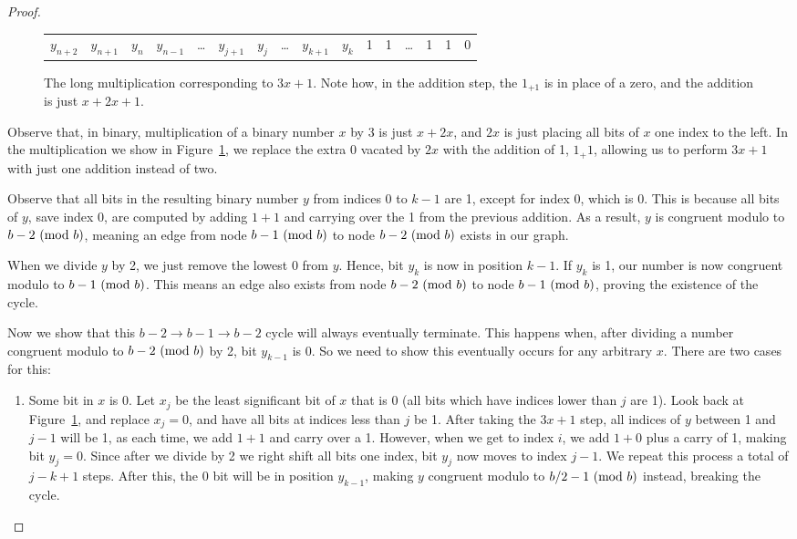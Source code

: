 \begin{proof}
\begin{figure}
\begin{tabular}{*{16}c}
  \hline
  $ y_{n+2}$  & $ y_{n+1}$  & $ y_{n}$  & $ y_{n-1}$  & \ldots & $ y_{j+1}$  & $ y_{j}$  & \ldots & $ y_{k+1}$  & $ y_{k}$  & 1 & 1 & \ldots & 1 & 1 & 0 
\end{tabular}
\caption{The long multiplication corresponding to $3x + 1$. Note how, in the addition step, the $1_{+1}$ is in place of a zero, and the addition is just $x + 2x + 1$.}
\label{fig:mul}
\end{figure}
Observe that, in binary, multiplication of a binary number $x$ by 3 is just $x + 2x$, and $2x$ is just placing all bits of $x$ one index to the left. In the multiplication we show in Figure~\ref{fig:mul}, we replace the extra 0 vacated by $2x$ with the addition of 1, $1_+1$, allowing us to perform $3x+1$ with just one addition instead of two. \par
Observe that all bits in the resulting binary number $y$ from indices 0 to $k-1$ are 1, except for index 0, which is 0. This is because all bits of $y$, save index 0, are computed by adding $1+1$ and carrying over the 1 from the previous addition. As a result, $y$ is congruent modulo to $b-2 \ (\mathrm{mod}\ b)$, meaning an edge from node $b-1 \ (\mathrm{mod}\ b)$ to node $b-2 \ (\mathrm{mod}\ b)$ exists in our graph.\par
When we divide $y$ by 2, we just remove the lowest 0 from $y$. Hence, bit $y_k$ is now in position $k-1$. If $y_k$ is 1, our number is now congruent modulo to $b-1 \ (\mathrm{mod}\ b)$. This means an edge also exists from node $b-2 \ (\mathrm{mod}\ b)$ to node $b-1 \ (\mathrm{mod}\ b)$, proving the existence of the cycle. \par
Now we show that this $b-2 \rightarrow b-1 \rightarrow b-2$ cycle will always eventually terminate. This happens when, after dividing a number congruent modulo to $b-2 \ (\mathrm{mod}\ b)$ by 2, bit $y_{k-1}$ is 0. So we need to show this eventually occurs for any arbitrary $x$. There are two cases for this:
\begin{enumerate}
    \item Some bit in $x$ is 0. Let $x_j$ be the least significant bit of $x$ that is 0 (all bits which have indices lower than $j$ are 1). Look back at Figure~\ref{fig:mul}, and replace $x_j = 0$, and have all bits at indices less than $j$ be 1. After taking the $3x+1$ step, all indices of $y$ between 1 and $j-1$ will be 1, as each time, we add $1 + 1$ and carry over a 1. However, when we get to index $i$, we add $1 + 0$ plus a carry of 1, making bit $y_j = 0$. Since after we divide by 2 we right shift all bits one index, bit $y_j$ now moves to index $j-1$. We repeat this process a total of $j-k+1$ steps. After this, the 0 bit will be in position $y_{k-1}$, making $y$ congruent modulo to $b/2 - 1 \ (\mathrm{mod}\ b)$ instead, breaking the cycle.

\end{enumerate}
\end{proof}
